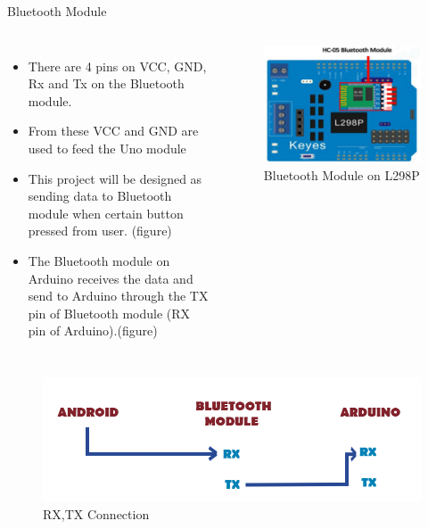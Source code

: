 \documentclass[xcolor=table, 9pt]{beamer}
\begin{document}


\begin{frame}{Bluetooth Module}
\begin{columns}[c] 
\begin{itemize}
\item There are 4 pins on VCC, GND, Rx and Tx on the Bluetooth module.
\item From these VCC and GND are used to feed the Uno module
\item This project will be designed as sending data to Bluetooth module when certain button
pressed from user. (figure)
\item The Bluetooth module on Arduino receives the data and send to Arduino through the TX pin
of Bluetooth module (RX pin of Arduino).(figure)
\end{itemize}
\begin{figure}
\includegraphics[width=1\linewidth]{blue.png}
\caption{Bluetooth Module on L298P}
\end{figure}
\end{columns}
\end{frame}



\begin{frame}
\begin{figure}
\includegraphics[width=1\linewidth]{bluetsheme.png}
\caption{RX,TX Connection}
\end{figure}
\end{frame}
\end{document}
